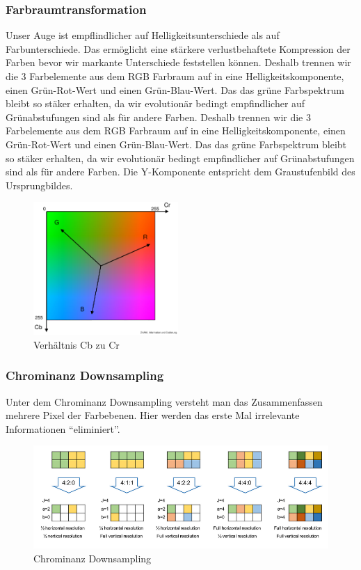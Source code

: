 \documentclass{article}
\begin{document}
\subsubsection{Farbraumtransformation}
Unser Auge ist empflindlicher auf Helligkeitsunterschiede als auf Farbunterschiede. Das ermöglicht eine stärkere verlustbehaftete Kompression der Farben bevor wir markante Unterschiede feststellen können. Deshalb trennen wir die 3 Farbelemente aus dem RGB Farbraum auf in eine Helligkeitskomponente, einen Grün-Rot-Wert und einen Grün-Blau-Wert. Das das grüne Farbspektrum bleibt so stäker erhalten, da wir evolutionär bedingt empfindlicher auf Grünabstufungen sind als für andere Farben. Deshalb trennen wir die 3 Farbelemente aus dem RGB Farbraum auf in eine Helligkeitskomponente, einen Grün-Rot-Wert und einen Grün-Blau-Wert. Das das grüne Farbspektrum bleibt so stäker erhalten, da wir evolutionär bedingt empfindlicher auf Grünabstufungen sind als für andere Farben.
Die Y-Komponente entspricht dem Graustufenbild des Ursprungbildes.
\begin{figure}[h!]
		\begin{center}
		\includegraphics[width=5.5cm]{img/cbcr.png}
		\end{center}
		\caption{Verhältnis Cb zu Cr}
		\label{fig:Verhältnis Cb zu Cr}
\end{figure}
\subsubsection{Chrominanz Downsampling}
Unter dem Chrominanz Downsampling versteht man das Zusammenfassen mehrere Pixel der Farbebenen. Hier werden das erste Mal irrelevante Informationen ``eliminiert''. 
\begin{figure}[h]
		\begin{center}
		\includegraphics[width=\linewidth]{img/downsampling.png}
		\end{center}
		\caption{Chrominanz Downsampling}
		\label{fig:Chrominanz Downsampling}
\end{figure}
\end{document}
